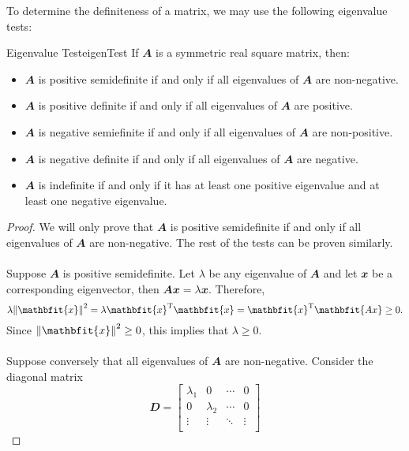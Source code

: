 \documentclass[math, code]{amznotes}
\theoremstyle{remark}
\begin{document}
To determine the definiteness of a matrix, we may use the following eigenvalue tests:
\begin{thmbox}{Eigenvalue Test}{eigenTest}
    If $\mathbfit{A}$ is a symmetric real square matrix, then:
    \begin{itemize}
        \item $\mathbfit{A}$ is positive semidefinite if and only if all eigenvalues of $\mathbfit{A}$ are non-negative.
        \item $\mathbfit{A}$ is positive definite if and only if all eigenvalues of $\mathbfit{A}$ are positive.
        \item $\mathbfit{A}$ is negative semiefinite if and only if all eigenvalues of $\mathbfit{A}$ are non-positive.
        \item $\mathbfit{A}$ is negative definite if and only if all eigenvalues of $\mathbfit{A}$ are negative.
        \item $\mathbfit{A}$ is indefinite if and only if it has at least one positive eigenvalue and at least one negative eigenvalue.
    \end{itemize}
    \tcblower
    \begin{proof}
        We will only prove that $\mathbfit{A}$ is positive semidefinite if and only if all eigenvalues of $\mathbfit{A}$ are non-negative. The rest of the tests can be proven similarly.
        \\\\
        Suppose $\mathbfit{A}$ is positive semidefinite. Let $\lambda$ be any eigenvalue of $\mathbfit{A}$ and let $\mathbfit{x}$ be a corresponding eigenvector, then $\mathbfit{Ax} = \lambda\mathbfit{x}$. Therefore,
        \begin{equation*}
            \lambda\norm{\mathbfit{x}}^2 = \lambda\mathbfit{x}^{\mathrm{T}}\mathbfit{x} = \mathbfit{x}^{\mathrm{T}}\mathbfit{Ax} \geq 0.
        \end{equation*}
        Since $\norm{\mathbfit{x}}^2 \geq 0$, this implies that $\lambda \geq 0$.
        \\\\
        Suppose conversely that all eigenvalues of $\mathbfit{A}$ are non-negative. Consider the diagonal matrix
        \begin{displaymath}
            \mathbfit{D} = \begin{bmatrix}
                \lambda_1 & 0 & \cdots & 0 \\
                0 & \lambda_2 & \cdots & 0 \\
                \vdots & \vdots & \ddots & \vdots \\

\end{bmatrix}
\end{displaymath}
\end{proof}
\end{thmbox}
\end{document}
